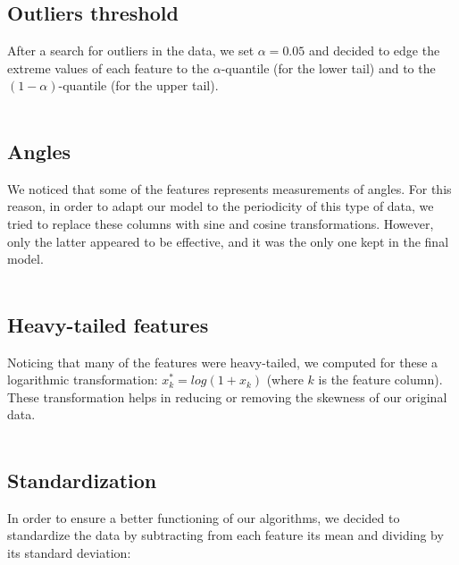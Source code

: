 \documentclass[10pt,conference,compsocconf]{IEEEtran}
\begin{document}
\subsection{Outliers threshold}
After a search for outliers in the data, we set $\alpha = 0.05$ and decided to edge the extreme values of each feature to the $\alpha$-quantile (for the lower tail) and to the $(1-\alpha)$-quantile (for the upper tail).\\
\vspace{-0.8cm}\\

\subsection{Angles}
We noticed that some of the features represents measurements of angles. For this reason, in order to adapt our model to the periodicity of this type of data, we tried to replace these columns with sine and cosine transformations. However, only the latter appeared to be effective, and it was the only one kept in the final model.\\
\vspace{-0.8cm}\\


\subsection{Heavy-tailed features}
Noticing that many of the features were heavy-tailed, we computed for these a logarithmic transformation: $x_{k}^{*} = log(1+x_k)$ (where $k$ is the feature column). These transformation  helps in reducing or removing the skewness of our original data.\\
\vspace{-0.8cm}\\

\subsection{Standardization}
In order to ensure a better functioning of our algorithms, we decided to standardize the data by subtracting from each feature its mean and dividing by its standard deviation: 
\end{document}
